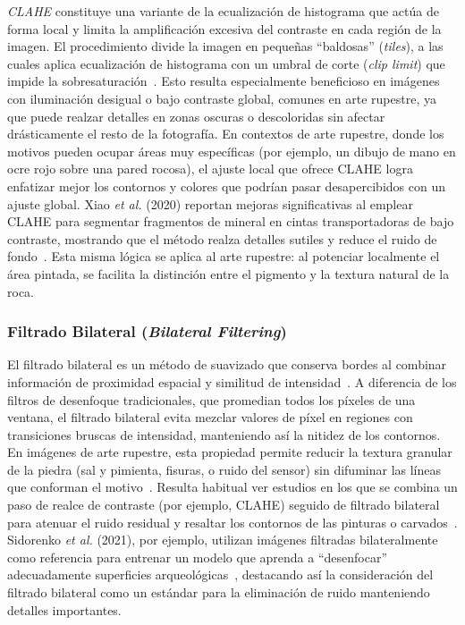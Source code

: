 \textit{CLAHE} constituye una variante de la ecualización de histograma que actúa de forma local y limita la amplificación excesiva del contraste en cada región de la imagen.
El procedimiento divide la imagen en pequeñas “baldosas” (\textit{tiles}), a las cuales aplica ecualización de histograma con un umbral de corte (\textit{clip limit}) que impide la sobresaturación~\cite{xiao2020}.
Esto resulta especialmente beneficioso en imágenes con iluminación desigual o bajo contraste global, comunes en arte rupestre, ya que puede realzar detalles en zonas oscuras o descoloridas sin afectar drásticamente el resto de la fotografía.
En contextos de arte rupestre, donde los motivos pueden ocupar áreas muy específicas (por ejemplo, un dibujo de mano en ocre rojo sobre una pared rocosa), el ajuste local que ofrece CLAHE logra enfatizar mejor los contornos y colores que podrían pasar desapercibidos con un ajuste global.
Xiao \textit{et al.} (2020) reportan mejoras significativas al emplear CLAHE para segmentar fragmentos de mineral en cintas transportadoras de bajo contraste, mostrando que el método realza detalles sutiles y reduce el ruido de fondo~\cite{xiao2020}.
Esta misma lógica se aplica al arte rupestre: al potenciar localmente el área pintada, se facilita la distinción entre el pigmento y la textura natural de la roca.

\subsubsection{Filtrado Bilateral (\textit{Bilateral Filtering})}

El filtrado bilateral es un método de suavizado que conserva bordes al combinar información de proximidad espacial y similitud de intensidad~\cite{paris2008,sidorenko2021}.
A diferencia de los filtros de desenfoque tradicionales, que promedian todos los píxeles de una ventana, el filtrado bilateral evita mezclar valores de píxel en regiones con transiciones bruscas de intensidad, manteniendo así la nitidez de los contornos.
En imágenes de arte rupestre, esta propiedad permite reducir la textura granular de la piedra (sal y pimienta, fisuras, o ruido del sensor) sin difuminar las líneas que conforman el motivo~\cite{xiao2020}.
Resulta habitual ver estudios en los que se combina un paso de realce de contraste (por ejemplo, CLAHE) seguido de filtrado bilateral para atenuar el ruido residual y resaltar los contornos de las pinturas o carvados~\cite{li2022}.
Sidorenko \textit{et al.} (2021), por ejemplo, utilizan imágenes filtradas bilateralmente como referencia para entrenar un modelo que aprenda a “desenfocar” adecuadamente superficies arqueológicas~\cite{sidorenko2021}, destacando así la consideración del filtrado bilateral como un estándar para la eliminación de ruido manteniendo detalles importantes.

